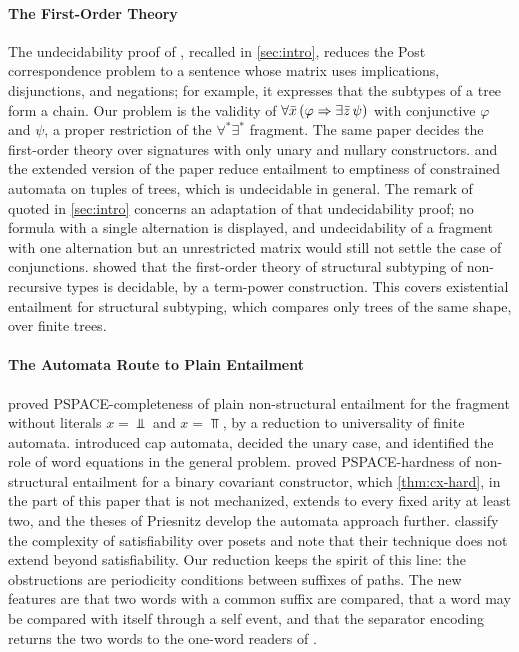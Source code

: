 \paragraph{The First-Order Theory}
The undecidability proof of \citet{SuAikenNiehrenPriesnitzTreinen02}, recalled
in \cref{sec:intro}, reduces the Post correspondence problem to a sentence whose
matrix uses implications, disjunctions, and negations; for example, it
expresses that the subtypes of a tree form a chain. Our problem is the validity
of $\forall\bar x\,(\varphi\Rightarrow\exists\bar z\,\psi)$ with conjunctive $\varphi$
and $\psi$, a proper restriction of the $\forall^*\exists^*$ fragment. The same
paper decides the first-order theory over signatures with only unary and
nullary constructors. \citet{Su02} and the extended version of the paper
\citep{SuEtAl06} reduce entailment to emptiness of constrained automata on
tuples of trees, which is undecidable in general. The remark of
\citet[Section~7.2.2]{Su02} quoted in \cref{sec:intro} concerns an adaptation
of that undecidability proof; no formula with a single alternation is
displayed, and undecidability of a fragment with one alternation but an
unrestricted matrix would still not settle the case of conjunctions.
\citet{KuncakRinard03} showed that the first-order theory of structural
subtyping of non-recursive types is decidable, by a term-power construction.
This covers existential entailment for structural subtyping, which compares
only trees of the same shape, over finite trees.

\paragraph{The Automata Route to Plain Entailment}
\citet{NiehrenPriesnitz99} proved PSPACE-completeness of plain non-structural
entailment for the fragment without literals $x=\Bot$ and $x=\Top$, by a
reduction to universality of finite automata.
\citet{NiehrenPriesnitz01,NiehrenPriesnitz03} introduced cap automata,
decided the unary case, and identified the role of word equations in the
general problem. \citet{HengleinRehof98} proved PSPACE-hardness of
non-structural entailment for a binary covariant constructor, which
\cref{thm:cx-hard}, in the part of this paper that is not mechanized, extends
to every fixed arity at least two, and the theses of
Priesnitz \citep{Priesnitz00,Priesnitz04} develop the automata approach
further. \citet{NiehrenPriesnitzSu05} classify the complexity of
satisfiability over posets and note that their technique does not extend
beyond satisfiability. Our reduction keeps the spirit of this line: the
obstructions are periodicity conditions between suffixes of paths. The new
features are that two words with a common suffix are compared, that a word may
be compared with itself through a self event, and that the separator encoding
returns the two words to the one-word readers of \citet{Zhao26}.

